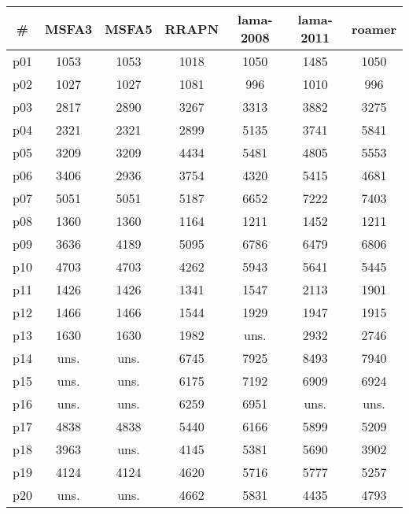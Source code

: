 \begin{tabular}{c||c|c|c|c|c|c}
\textbf{\#} & \textbf{MSFA3} & \textbf{MSFA5} & \textbf{RRAPN} & \textbf{lama-2008} & \textbf{lama-2011} & \textbf{roamer}\\
\hline
\hline
p01 & 1053 & 1053 & 1018 & 1050 & 1485 & 1050\\
p02 & 1027 & 1027 & 1081 & 996 & 1010 & 996\\
p03 & 2817 & 2890 & 3267 & 3313 & 3882 & 3275\\
p04 & 2321 & 2321 & 2899 & 5135 & 3741 & 5841\\
p05 & 3209 & 3209 & 4434 & 5481 & 4805 & 5553\\
p06 & 3406 & 2936 & 3754 & 4320 & 5415 & 4681\\
p07 & 5051 & 5051 & 5187 & 6652 & 7222 & 7403\\
p08 & 1360 & 1360 & 1164 & 1211 & 1452 & 1211\\
p09 & 3636 & 4189 & 5095 & 6786 & 6479 & 6806\\
p10 & 4703 & 4703 & 4262 & 5943 & 5641 & 5445\\
p11 & 1426 & 1426 & 1341 & 1547 & 2113 & 1901\\
p12 & 1466 & 1466 & 1544 & 1929 & 1947 & 1915\\
p13 & 1630 & 1630 & 1982 & uns. & 2932 & 2746\\
p14 & uns. & uns. & 6745 & 7925 & 8493 & 7940\\
p15 & uns. & uns. & 6175 & 7192 & 6909 & 6924\\
p16 & uns. & uns. & 6259 & 6951 & uns. & uns.\\
p17 & 4838 & 4838 & 5440 & 6166 & 5899 & 5209\\
p18 & 3963 & uns. & 4145 & 5381 & 5690 & 3902\\
p19 & 4124 & 4124 & 4620 & 5716 & 5777 & 5257\\
p20 & uns. & uns. & 4662 & 5831 & 4435 & 4793\\
\end{tabular}

